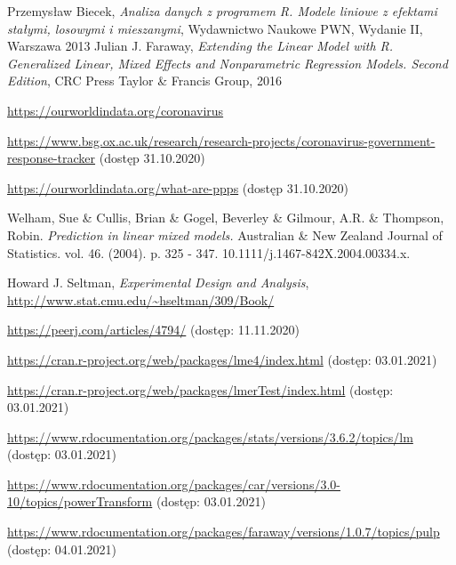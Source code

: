 \documentclass[12pt]{mwbk}
\theoremstyle{plain}
\theoremstyle{definition}
\theoremstyle{remark}
\begin{document}
\begin{thebibliography}{99}



 Przemysław Biecek, \emph{Analiza danych z programem R. Modele liniowe z efektami stałymi, losowymi i mieszanymi}, Wydawnictwo Naukowe PWN, Wydanie II, Warszawa 2013
 Julian J. Faraway, \emph{Extending the Linear Model with R. Generalized Linear, Mixed Effects and Nonparametric Regression Models. Second Edition}, CRC Press Taylor \& Francis  Group, 2016

 \url{https://ourworldindata.org/coronavirus}

 \url{https://www.bsg.ox.ac.uk/research/research-projects/coronavirus-government-response-tracker} (dostęp 31.10.2020)

 \url{https://ourworldindata.org/what-are-ppps} (dostęp 31.10.2020)

 Welham, Sue \& Cullis, Brian \& Gogel, Beverley \& Gilmour, A.R. \& Thompson, Robin. \emph{Prediction in linear mixed models.} Australian \& New Zealand Journal of Statistics. vol. 46.  (2004). p.  325 - 347. 10.1111/j.1467-842X.2004.00334.x. 

 Howard J. Seltman, \emph{Experimental Design and Analysis}, \url{http://www.stat.cmu.edu/~hseltman/309/Book/}

 \url{https://peerj.com/articles/4794/} (dostęp: 11.11.2020)

 \url{https://cran.r-project.org/web/packages/lme4/index.html} (dostęp: 03.01.2021)

 \url{https://cran.r-project.org/web/packages/lmerTest/index.html} (dostęp: 03.01.2021)

 \url{https://www.rdocumentation.org/packages/stats/versions/3.6.2/topics/lm} (dostęp: 03.01.2021)

 \url{https://www.rdocumentation.org/packages/car/versions/3.0-10/topics/powerTransform} (dostęp: 03.01.2021)


 \url{https://www.rdocumentation.org/packages/faraway/versions/1.0.7/topics/pulp} (dostęp: 04.01.2021)
\end{thebibliography}



\listoffigures
\end{document}
